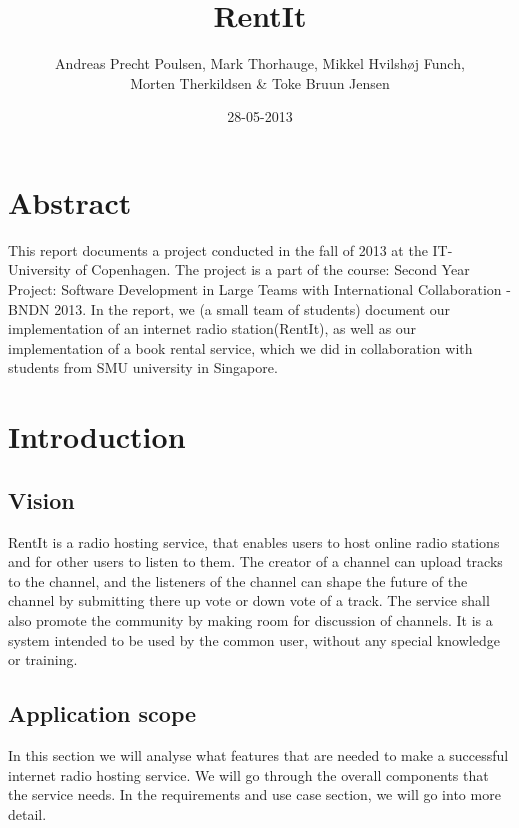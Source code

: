 \documentclass[a4paper,11pt,report]{article}
\begin{document}
\title{RentIt}
\author{Andreas Precht Poulsen, Mark Thorhauge, Mikkel Hvilsh\o j Funch,\\Morten Therkildsen \& Toke Bruun Jensen}
\date{28-05-2013}
\maketitle

\section*{Abstract}
{
This report documents a project conducted in the fall of 2013 at the IT-University of Copenhagen. The project is a part of the course: Second Year Project: Software Development in Large Teams with International Collaboration - BNDN 2013. In the report, we (a small team of students) document our implementation of an internet radio station(RentIt), as well as our implementation of a book rental service, which we did in collaboration with students from SMU university in Singapore.\\ 
\newpage

\tableofcontents

\section{Introduction}
\subsection{Vision}
RentIt is a radio hosting service, that enables users to host online radio stations and for other users to listen to them. The creator of a channel can upload tracks to the channel, and the listeners of the channel can shape the future of the channel by submitting there up vote or down vote of a track. The service shall also promote the community by making room for discussion of channels.
It is a system intended to be used by the common user, without any special knowledge or training.

\subsection{Application scope}
In this section we will analyse what features that are needed to make a successful internet radio hosting service. We will go through the overall components that the service needs. In the requirements and use case section, we will go into more detail.

}
\end{document}
